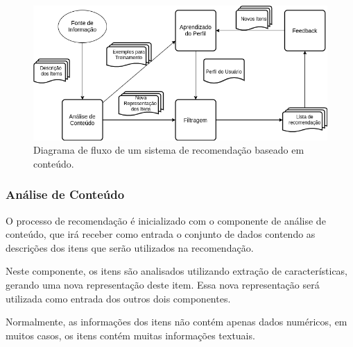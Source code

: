 \begin{figure}[h!]
   
    \centering
    \includegraphics[width=12cm]{Imagens/content-based.png}
   \caption{Diagrama de fluxo de um sistema de recomendação baseado em conteúdo.}
    \label{fig:cb}
    
\end{figure}
\subsubsection{Análise de Conteúdo}
O processo de recomendação é inicializado com o componente de análise de conteúdo, que irá receber como entrada o conjunto de dados contendo as descrições dos itens que serão utilizados na recomendação.

Neste componente, os itens são analisados utilizando extração de características, gerando uma nova representação deste item. Essa nova representação será utilizada como entrada dos outros dois componentes.

Normalmente,  as informações dos itens não contém apenas dados numéricos, em muitos casos, os itens contém muitas informações textuais. 

